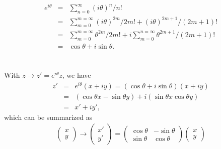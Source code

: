 \documentclass[11pt]{article}
\begin{document}
\section{ }
\begin{eqnarray}
  e^{i \theta}&=&\sum^\infty_{n=0}(i \theta)^n/n! \nonumber \\
  &=&\sum_{m=0}^{m=\infty}  (i\theta )^{2m}/{2m}! + (i \theta )^{2m+1}/(2m+1)! \\
  &=&\sum_{m=0}^{m=\infty} \theta ^{2m}/{2m}!+i \sum_{m=0}^{n=\infty} \theta^{2m+1}/(2m+1)!\\
  &=&\cos \theta + i \sin \theta.
\end{eqnarray}

\section{ }
With $z \to z'= e^{i \theta} z$, we have 
\begin{eqnarray}
  z'&=&  e^{i \theta} (x+iy) =(\cos \theta +i \sin \theta) (x+iy)\\
  &=& (\cos \theta x-\sin \theta y)+i (\sin \theta x \cos \theta y) \\
  &=& x'+iy',
\end{eqnarray}
which can be summarized as
\begin{eqnarray}
  \begin{pmatrix}
    x\\y 
  \end{pmatrix} \rightarrow
  \begin{pmatrix}
    x'\\y'
  \end{pmatrix} = 
  \begin{pmatrix}
    \cos \theta & -\sin \theta\\
    \sin \theta&\cos \theta
  \end{pmatrix}
  \begin{pmatrix}
    x\\y
  \end{pmatrix}
\end{eqnarray}
\end{document}
